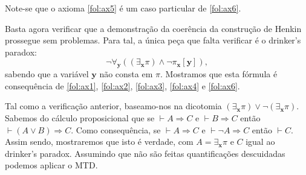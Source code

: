 \documentclass{report}
\theoremstyle{definition}
\theoremstyle{remark}
\renewcommand{\bf}[1]{\mathbf{#1}}
\newcommand{\imply}{\mathbin{\Rightarrow}}
\begin{document}
	Note-se que o axioma \eqref{fol:ax5} é um caso particular de \eqref{fol:ax6}.

	Basta agora verificar que a demonstração da coerência da construção de Henkin prossegue sem problemas. Para tal, a única peça que falta verificar é o drinker's paradox:
	\[\neg \forall_{\bf y} ( (\exists_{\bf x} \pi) \land \neg \pi_{\bf x}[\bf y]),\]
	sabendo que a variável $\bf y$ não consta em $\pi$. Mostramos que esta fórmula é consequência de \eqref{fol:ax1}, \eqref{fol:ax2}, \eqref{fol:ax3}, \eqref{fol:ax4} e \eqref{fol:ax6}.

	Tal como a verificação anterior, baseamo-nos na dicotomia $(\exists_{\bf x} \pi) \lor \neg (\exists_{\bf x} \pi)$. Sabemos do cálculo proposicional que se $\vdash A \imply C$ e $\vdash B \imply C$ então $\vdash (A \lor B) \imply C$. Como consequência, se $\vdash A \imply C$ e $\vdash \neg A \imply C$ então $\vdash C$. Assim sendo, mostraremos que isto é verdade, com $A = \exists_{\bf x} \pi$ e $C$ igual ao drinker's paradox. Assumindo que não são feitas quantificações descuidadas podemos aplicar o MTD.
\end{document}
